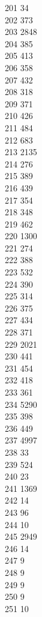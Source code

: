 { 201	34 \\
 202	373 \\
 203	2848 \\
 204	385 \\
 205	413 \\
 206	358 \\
 207	432 \\
 208	318 \\
 209	371 \\
 210	426 \\
 211	484 \\
 212	683 \\
 213	2135 \\
 214	276 \\
 215	389 \\
 216	439 \\
 217	354 \\
 218	348 \\
 219	462 \\
 220	1300 \\
 221	274 \\
 222	388 \\
 223	532 \\
 224	390 \\
 225	314 \\
 226	375 \\
 227	434 \\
 228	371 \\
 229	2021 \\
 230	441 \\
 231	454 \\
 232	418 \\
 233	361 \\
 234	5290 \\
 235	398 \\
 236	449 \\
 237	4997 \\
 238	33 \\
 239	524 \\
 240	23 \\
 241	1369 \\
 242	14 \\
 243	96 \\
 244	10 \\
 245	2949 \\
 246	14 \\
 247	9 \\
 248	9 \\
 249	9 \\
 250	9 \\
 251	10 \\
}
